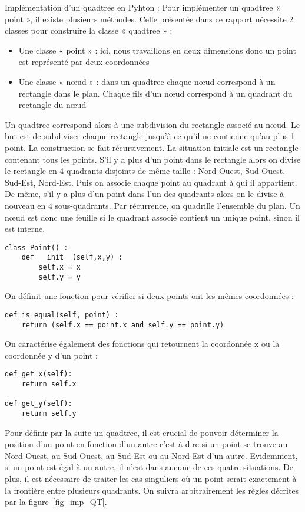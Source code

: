 \documentclass{report}
\begin{document}
Implémentation d’un quadtree en Pyhton :
Pour implémenter un quadtree « point », il existe plusieurs méthodes. Celle présentée dans ce rapport nécessite 2 classes pour construire la classe « quadtree » :
\begin{itemize}
\item Une classe « point » : ici, nous travaillons en deux dimensions donc un point est représenté par deux coordonnées
\item Une classe « nœud » : dans un quadtree chaque nœud correspond à un rectangle dans le plan. Chaque fils d’un nœud correspond à un quadrant du rectangle du nœud 
\end{itemize}
Un quadtree correspond alors à une subdivision du rectangle associé au nœud. Le but est de subdiviser chaque rectangle jusqu’à ce qu’il ne contienne qu’au plus 1 point.
La construction se fait récursivement. La situation initiale est un rectangle contenant tous les points. S’il y a plus d’un point dans le rectangle alors on divise le rectangle en 4 quadrants disjoints de même taille : Nord-Ouest, Sud-Ouest, Sud-Est, Nord-Est. Puis on associe chaque point au quadrant à qui il appartient. De même, s’il y a plus d’un point dans l’un des quadrants alors on le divise à nouveau en 4 sous-quadrants. Par récurrence, on quadrille l’ensemble du plan.
Un nœud est donc une feuille si le quadrant associé contient un unique point, sinon il est interne.
\begin{lstlisting}
class Point() :
	def __init__(self,x,y) :
		self.x = x
		self.y = y
\end{lstlisting}

On définit une fonction pour vérifier si deux points ont les mêmes coordonnées : 
\begin{lstlisting}
def is_equal(self, point) :
	return (self.x == point.x and self.y == point.y)
\end{lstlisting}

On caractérise également des fonctions qui retournent la coordonnée x ou la coordonnée y d’un point :
\begin{lstlisting}
def get_x(self):
	return self.x
	
def get_y(self):
	return self.y
\end{lstlisting}
 
Pour définir par la suite un quadtree, il est crucial de pouvoir déterminer la position d’un point en fonction d’un autre c’est-à-dire si un point se trouve au Nord-Ouest, au Sud-Ouest, au Sud-Est ou au Nord-Est d’un autre. Evidemment, si un point est égal à un autre, il n'est dans aucune de ces quatre situations. De plus, il est nécessaire de traiter les cas singuliers où un point serait exactement à la frontière entre plusieurs quadrants. On suivra arbitrairement les règles décrites par la figure~\ref{fig_imp_QT}.
\end{document}
